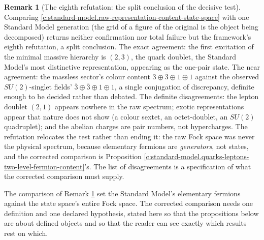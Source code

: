 \documentclass[11pt]{article}
\theoremstyle{definition}
\newtheorem{remark}[theorem]{Remark}
\theoremstyle{plain}
\begin{document}
\begin{remark}[The eighth refutation: the split conclusion of the decisive test]\label{c:note.standard-model.eighth-refutation-split-conclusion-decisive-test}
Comparing \ref{c:standard-model.raw-representation-content-state-space} with one Standard Model generation (the grid of a figure of the original is the object being decomposed) returns neither confirmation nor total failure but the framework's eighth refutation, a split conclusion. The exact agreement: the first excitation of the minimal massive hierarchy is $(2,3)$, the quark doublet, the Standard Model's most distinctive representation, appearing as the one-pair state. The near agreement: the massless sector's colour content $3 \oplus \bar{3} \oplus 1 \oplus 1$ against the observed $SU(2)$-singlet fields' $\bar{3} \oplus \bar{3} \oplus 1 \oplus 1$, a single conjugation of discrepancy, definite enough to be decided rather than debated. The definite disagreements: the lepton doublet $(2,1)$ appears nowhere in the raw spectrum; exotic representations appear that nature does not show (a colour sextet, an octet-doublet, an $SU(2)$ quadruplet); and the abelian charges are pair numbers, not hypercharges. The refutation relocates the test rather than ending it: the raw Fock space was never the physical spectrum, because elementary fermions are \emph{generators}, not states, and the corrected comparison is Proposition \ref{c:standard-model.quarks-leptons-two-level-fermion-content}'s. The list of disagreements is a specification of what the corrected comparison must supply.
\end{remark}

\label{c:note.standard-model.setting-content-charges-chirality-2}
The comparison of Remark \ref{c:note.standard-model.eighth-refutation-split-conclusion-decisive-test} set the Standard Model's elementary fermions against the state space's entire Fock space. The corrected comparison needs one definition and one declared hypothesis, stated here so that the propositions below are about defined objects and so that the reader can see exactly which results rest on which.
\end{document}
